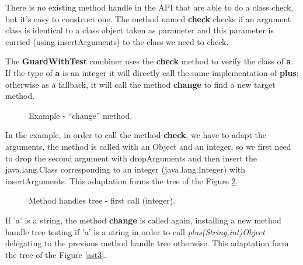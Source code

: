 \documentclass{sig-alternate}
\begin{document}
      There is no existing method handle in the API that are able to do a class check,
      but it's easy to construct one. The method named {\bf check} checks if an argument class
      is identical to a class object taken as parameter and this parameter is curried
      (using insertArguments) to the class we need to check.

      The {\bf GuardWithTest} combiner uses the {\bf check} method to verify the class of {\bf a}.
      If the type of {\bf a} is an integer it will directly call the same implementation of {\bf plus};
      otherwise as a fallback, it will call the method {\bf change} to find a new target method.

      \begin{figure}[!h]
        \centering \vspace{-1.5em}
        \caption{Example - ``change'' method.}\vspace{-.7em}
        \label{fooCHANGE}
      \end{figure}

      In the example, in order to call the method {\bf check}, we have to adapt the arguments,
      the method is called with an Object and an integer, so we first need to drop the second
      argument with dropArguments and then insert the java.lang.Class corresponding to an integer
      (java.lang.Integer) with insertArguments.
      This adaptation forms the tree of the Figure \ref{ast2}.

      \begin{figure}[!h]
        \hspace{-.6in} \resizebox{1.3\linewidth}{!}{}
        \caption{Method handles tree - first call (integer).}\vspace{-1em}
        \label{ast2}
      \end{figure}

      If 'a' is a string, the method {\bf change} is called again,
      installing a new method handle tree testing if 'a' is a string in order to call {\it plus(String,int)Object}
      delegating to the previous method handle tree otherwise.
      This adaptation form the tree of the Figure \ref{ast3}.

      \begin{figure*}
        \centering \resizebox{.8\linewidth}{!}{}
        \caption{Method handles tree - second call (string).}\vspace{-1em}
        \label{ast3}
      \end{figure*}
\end{document}
